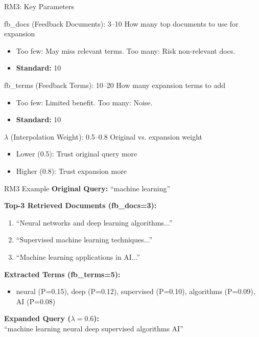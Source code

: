 \documentclass[aspectratio=169]{beamer}
\newif\ifanimated
\newcommand{\cpause}{\ifanimated\pause\fi}
\begin{document}
\begin{frame}[shrink=12]{RM3: Key Parameters}
\begin{block}{fb\_docs (Feedback Documents): 3--10}
How many top documents to use for expansion
\begin{itemize}
    \item Too few: May miss relevant terms. Too many: Risk non-relevant docs.
    \item \textbf{Standard:} 10
\end{itemize}\cpause
\end{block}

\begin{block}{fb\_terms (Feedback Terms): 10--20}
How many expansion terms to add
\begin{itemize}
    \item Too few: Limited benefit. Too many: Noise.
    \item \textbf{Standard:} 10
\end{itemize}\cpause
\end{block}

\begin{block}{$\lambda$ (Interpolation Weight): 0.5--0.8}
Original vs. expansion weight
\begin{itemize}
    \item Lower (0.5): Trust original query more
    \item Higher (0.8): Trust expansion more
\end{itemize}
\end{block}
\end{frame}

\begin{frame}[shrink=5]{RM3 Example}
\textbf{Original Query:} ``machine learning''

\vspace{0.5em}

\textbf{Top-3 Retrieved Documents (fb\_docs=3):}
\begin{enumerate}
    \item ``Neural networks and deep learning algorithms...''
    \item ``Supervised machine learning techniques...''
    \item ``Machine learning applications in AI...''
\end{enumerate}

\vspace{0.5em}

\textbf{Extracted Terms (fb\_terms=5):}
\begin{itemize}
    \item neural (P=0.15), deep (P=0.12), supervised (P=0.10), algorithms (P=0.09), AI (P=0.08)
\end{itemize}\cpause

\vspace{0.5em}

\textbf{Expanded Query ($\lambda=0.6$):}
\\
``machine learning neural deep supervised algorithms AI''
\end{frame}
\end{document}
